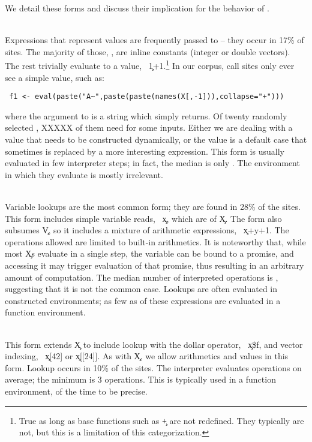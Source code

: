 \documentclass[screen,acmsmall]{acmart}%
\begin{document}
\medskip  We detail these forms and discuss their implication for the behavior of \eval.

\newcommand{\EE}[1]{{{\emph{\framebox{#1}}}}\\[1mm]}

\medskip\EE{$min(e)=\c{V}$} Expressions that represent values are
frequently passed to \eval -- they occur in 17\% of sites. The majority of
those, \packageValOneNodePercent, are inline constants (integer or double
vectors). The rest trivially evaluate to a value, \eg~\c{1+1}.\footnote{True as
long as base functions such as \c{+} are not redefined. They typically are not,
but this is a limitation of this categorization.} In our corpus,
\packageNbCallSitesUniqueActualValue call sites only ever see a simple value,
such as:
\begin{lstlisting}
 f1 <- eval(paste("A~",paste(paste(names(X[,-1])),collapse="+")))
\end{lstlisting}
where the argument to \eval is a string which \eval simply returns. Of twenty
randomly selected \evals, XXXXX
of them need \eval for
some inputs. Either we are dealing with a value that needs to be constructed
dynamically, or the value is a default case that sometimes is replaced by a more
interesting expression. This form is usually evaluated in few interpreter steps;
in fact, the median is only \packageMinimizedmedianoperationscRnd. The
environment in which they evaluate is mostly irrelevant.

\medskip\EE{$min(e)=\c{X}$} Variable lookups are the most common form;
they are found in 28\% of the sites. This form includes simple variable reads,
\eg~\c{x}, which are \packageNbSymbolVarSitePercent of \c X. The form also
subsumes \c{V}, so it includes a mixture of arithmetic expressions,
\eg~\c{x+y+1}. The operations allowed are limited to built-in arithmetics. It is
noteworthy that, while most \c{X}\!s evaluate in a single step, the variable can
be bound to a promise, and accessing it may trigger evaluation of that promise,
thus resulting in an arbitrary amount of computation. The median number of
interpreted operations is \packageMinimizedmedianoperationsaRnd, suggesting that
it is not the common case. Lookups are often evaluated in constructed
environments; as few as \packageMinimizedpercentparentframesa of these
expressions are evaluated in a function environment.

\medskip\EE{$min(e)=\c{\$}$} This form extends \c X to include lookup
with the dollar operator, \eg~\c{x\$f}, and vector indexing, \eg~\c{x[42]} or
\c{x[[24]]}. As with \c X, we allow arithmetics and values in this form. Lookup
occurs in 10\% of the sites. The interpreter evaluates
\packageMinimizedmedianoperationsgRnd operations on average; the minimum is 3
operations. This is typically used in a function environment,
\packageMinimizedpercentparentframese of the time to be precise.
\end{document}
